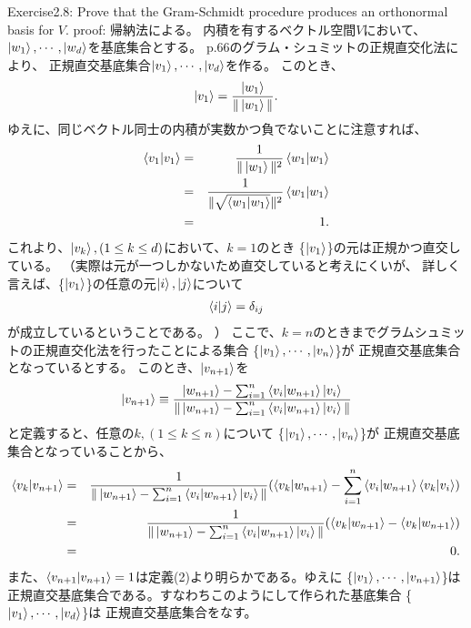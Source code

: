 \setcounter{equation}{0}
\begin{flushleft}
{\Large Exercise2.8:} Prove that the Gram-Schmidt procedure produces an orthonormal basis for $V$.
\newline
{\large proof:}
帰納法による。
内積を有するベクトル空間$V$において、
$\ket{w_1}, \cdots, \ket{w_d}$を基底集合とする。
p.66のグラム・シュミットの正規直交化法により、
正規直交基底集合$\ket{v_1}, \cdots, \ket{v_d}$を作る。
このとき、
\begin{eqnarray}
\ket{v_1} = \frac{\ket{w_1}}{\|\ket{w_1}\|}.
\end{eqnarray}
ゆえに、同じベクトル同士の内積が実数かつ負でないことに注意すれば、
\begin{eqnarray*}
\braket{v_1|v_1} &=& \frac{1}{\|\ket{w_1}\|^2}\braket{w_1|w_1}\\
&=& \frac{1}{\|\sqrt{\braket{w_1|w_1}}\|^2}\braket{w_1|w_1}\\
&=& 1.
\end{eqnarray*}
これより、$\ket{v_k},(1\leq k\leq d)$において、$k = 1$のとき 
\{$\ket{v_1}$\}の元は正規かつ直交している。
（実際は元が一つしかないため直交していると考えにくいが、
詳しく言えば、\{$\ket{v_1}$\}の任意の元$\ket{i}, \ket{j}$について
\begin{eqnarray*}
\braket{i|j} = \delta_{ij}
\end{eqnarray*}
が成立しているということである。
）
\newline
ここで、$k = n$のときまでグラムシュミットの正規直交化法を行ったことによる集合
\{$\ket{v_1}, \cdots, \ket{v_{n}}$\}が
正規直交基底集合となっているとする。
このとき、$\ket{v_{n+1}}$を
\begin{eqnarray}
\ket{v_{n+1}} \equiv \frac{\ket{w_{n+1}} - 
\sum_{i=1}^n\braket{v_i|w_{n+1}}\ket{v_i}}
{\|\ket{w_{n+1}} - 
\sum_{i=1}^n\braket{v_i|w_{n+1}}\ket{v_i}\|}
\end{eqnarray}
と定義すると、任意の$k, (1\leq k\leq n)$について
\{$\ket{v_1}, \cdots, \ket{v_{n}}$\}が
正規直交基底集合となっていることから、
\begin{eqnarray*}
\braket{v_k|v_{n+1}} &=& \frac{1}{\|\ket{w_{n+1}} - 
\sum_{i=1}^n\braket{v_i|w_{n+1}}\ket{v_i}\|}
(\braket{v_k|w_{n+1}} - 
\sum_{i=1}^n\braket{v_i|w_{n+1}}\braket{v_k|v_i})\\
&=& \frac{1}{\|\ket{w_{n+1}} - 
\sum_{i=1}^n\braket{v_i|w_{n+1}}\ket{v_i}\|}
(\braket{v_k|w_{n+1}} - \braket{v_k|w_{n+1}})\\
&=& 0.
\end{eqnarray*}
また、$\braket{v_{n+1}|v_{n+1}} = 1$は定義(2)より明らかである。ゆえに
\{$\ket{v_1}, \cdots, \ket{v_{n+1}}$\}は
正規直交基底集合である。すなわちこのようにして作られた基底集合
\{$\ket{v_1}, \cdots, \ket{v_{d}}$\}は
正規直交基底集合をなす。
\end{flushleft}
